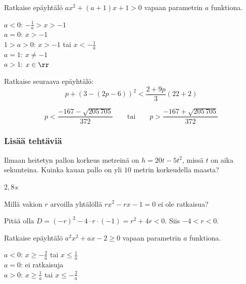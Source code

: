\begin{tehtavasivu}
\begin{tehtava}
    Ratkaise epäyhtälö $ax^2+(a+1)x+1 > 0$ vapaan parametrin $a$ funktiona.
    \begin{vastaus}
        $a < 0$: $-\frac{1}{a} > x > -1$ \\ $a = 0$: $x > -1$ \\ $1 > a > 0$: $x > -1$ tai $x < -\frac{1}{a}$ \\ $a = 1$: $x \neq -1$ \\ $a > 1$: $x \in \rr$
    \end{vastaus}
\end{tehtava}


\begin{tehtava}
    Ratkaise seuraava epäyhtälö:
    $$p+(3-(2p-6))^2<\dfrac{2+9p}{3}(22+2)$$
    \begin{vastaus}
        $$p<\dfrac{-167-\sqrt{205\,705}}{372} \qquad\text{tai}\qquad p>\dfrac{-167+\sqrt{205\,705}}{372}$$
    \end{vastaus}
\end{tehtava}

\subsubsection*{Lisää tehtäviä}

\begin{tehtava}
Ilmaan heitetyn pallon korkeus metreinä on $h=20t-5t^2$, missä $t$ on aika sekunteina. Kuinka kauan pallo on yli $10$ metrin korkeudella maasta?
    \begin{vastaus}
	$2,8$\,s
    \end{vastaus}
\end{tehtava}

\begin{tehtava}
	Millä vakion $r$ arvoilla yhtälöllä $rx^2-rx-1 = 0$ ei ole ratkaisua?
	\begin{vastaus}
		Pitää olla $D=(-r)^2-4 \cdot r \cdot (-1)=r^2+4r<0$. Siis $-4 < r < 0$.
	\end{vastaus}
\end{tehtava}

\begin{tehtava}
    Ratkaise epäyhtälö $a^2x^2+ax-2 \geq 0$ vapaan parametrin $a$ funktiona.
    \begin{vastaus}
        $a < 0$: $x \geq -\frac{2}{a}$ tai $x \leq \frac{1}{a}$ \\ $a = 0$: ei ratkaisuja \\ $a > 0$: $x \geq \frac{1}{a}$ tai $x \leq -\frac{2}{a}$
    \end{vastaus}
\end{tehtava}

\end{tehtavasivu}